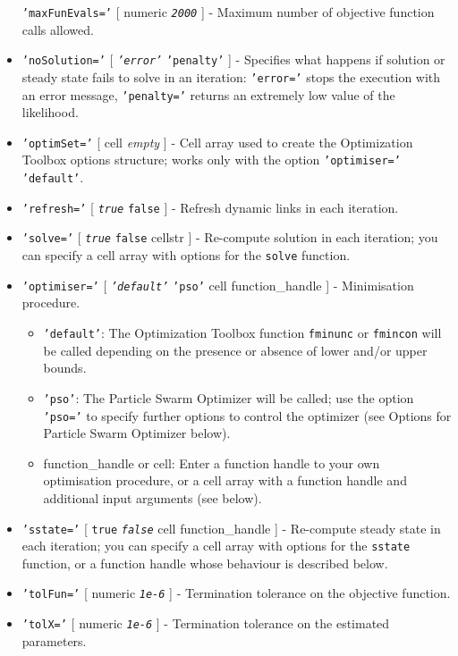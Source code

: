 \begin{itemize}
  \texttt{'maxFunEvals='} {[} numeric \textbar{} \emph{\texttt{2000}}
  {]} - Maximum number of objective function calls allowed.
\item
  \texttt{'noSolution='} {[} \emph{\texttt{'error'}} \textbar{}
  \texttt{'penalty'} {]} - Specifies what happens if solution or steady
  state fails to solve in an iteration: \texttt{'error='} stops the
  execution with an error message, \texttt{'penalty='} returns an
  extremely low value of the likelihood.
\item
  \texttt{'optimSet='} {[} cell \textbar{} \emph{empty} {]} - Cell array
  used to create the Optimization Toolbox options structure; works only
  with the option \texttt{'optimiser='} \texttt{'default'}.
\item
  \texttt{'refresh='} {[} \emph{\texttt{true}} \textbar{} \texttt{false}
  {]} - Refresh dynamic links in each iteration.
\item
  \texttt{'solve='} {[} \emph{\texttt{true}} \textbar{} \texttt{false}
  \textbar{} cellstr {]} - Re-compute solution in each iteration; you
  can specify a cell array with options for the \texttt{solve} function.
\item
  \texttt{'optimiser='} {[} \emph{\texttt{'default'}} \textbar{}
  \texttt{'pso'} \textbar{} cell \textbar{} function\_handle {]} -
  Minimisation procedure.

  \begin{itemize}
  \item
    \texttt{'default'}: The Optimization Toolbox function
    \texttt{fminunc} or \texttt{fmincon} will be called depending on the
    presence or absence of lower and/or upper bounds.
  \item
    \texttt{'pso'}: The Particle Swarm Optimizer will be called; use the
    option \texttt{'pso='} to specify further options to control the
    optimizer (see Options for Particle Swarm Optimizer below).
  \item
    function\_handle or cell: Enter a function handle to your own
    optimisation procedure, or a cell array with a function handle and
    additional input arguments (see below).
  \end{itemize}
\item
  \texttt{'sstate='} {[} \texttt{true} \textbar{} \emph{\texttt{false}}
  \textbar{} cell \textbar{} function\_handle {]} - Re-compute steady
  state in each iteration; you can specify a cell array with options for
  the \texttt{sstate} function, or a function handle whose behaviour is
  described below.
\item
  \texttt{'tolFun='} {[} numeric \textbar{} \emph{\texttt{1e-6}} {]} -
  Termination tolerance on the objective function.
\item
  \texttt{'tolX='} {[} numeric \textbar{} \emph{\texttt{1e-6}} {]} -
  Termination tolerance on the estimated parameters.
\end{itemize}

